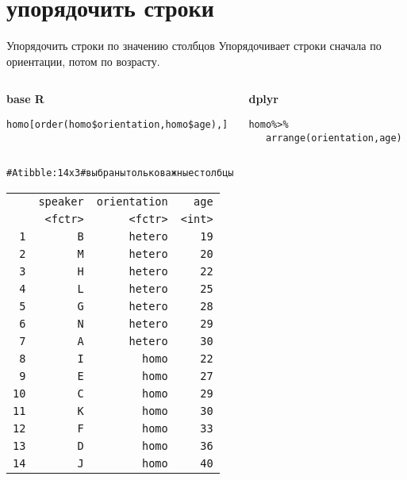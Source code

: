 \section{упорядочить строки}
\begin{frame}{Упорядочить строки по значению столбцов}
\noindent Упорядочивает строки сначала по ориентации, потом по возрасту.\\ \vfill
\begin{columns}[T] 
\begin{column}{.62\textwidth}
\textbf{base R}\\
\scriptsize
\begin{alltt}
homo[order(homo\$orientation, homo\$age), ]
\end{alltt}
\normalsize
\end{column}
\hfill
\begin{column}{.37\textwidth}
\textbf{dplyr}\\
\scriptsize
\begin{alltt}
homo \alert{\%>\%}\\ 
\ \ \ \alert{arrange(}orientation, age\alert{)}
\end{alltt}
\normalsize
\end{column}
\end{columns}
\hfill
\scriptsize
\begin{alltt}
\# A tibble: 14 x 3 \hfill \# выбраны только важные столбцы\\
\begin{tabular}{rrrr}
 & speaker & orientation & age \\ 
 & <fctr> & <fctr> & <int> \\ 
1 & B & hetero & 19 \\ 
2 & M & hetero & 20 \\ 
3 & H & hetero & 22 \\ 
4 & L & hetero & 25 \\ 
5 & G & hetero & 28 \\ 
6 & N & hetero & 29 \\ 
7 & A & hetero & 30 \\ 
8 & I & homo & 22 \\ 
9 & E & homo & 27 \\ 
10 & C & homo & 29 \\ 
11 & K & homo & 30 \\ 
12 & F & homo & 33 \\ 
13 & D & homo & 36 \\ 
14 & J & homo & 40 \\ 
\end{tabular}
\\
\end{alltt}
\normalsize
\hfill\\
\end{frame}

